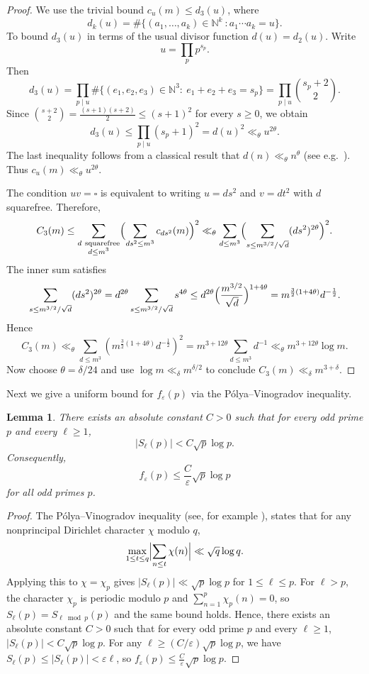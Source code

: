 \documentclass[11pt,letterpaper,reqno]{amsart}
\newtheorem{lemma}[theorem]{Lemma}
\theoremstyle{definition}
\numberwithin{equation}{section}
\newcommand{\eps}{\varepsilon}
\newcommand{\1}{\mathbf{1}}
\begin{document}
\begin{proof}

We use the trivial bound $c_u(m)\le d_3(u)$, where 
\[d_k(u)=\#\{(a_1,\dots,a_k)\in \mathbb{N}^k\ :a_1\dotsm a_k=u\}.\]
To bound $d_3(u)$ in terms of the usual divisor function $d(u)=d_2(u)$. Write
\[
u=\prod_{p}p^{s_p}.
\]
Then
\[
d_3(u)
=\prod_{p\mid u}\#\{(e_1,e_2,e_3)\in\mathbb{N}^3:\ e_1+e_2+e_3=s_p\}
=\prod_{p\mid u}\binom{s_p+2}{2}.
\]
Since $\binom{s+2}{2}=\frac{(s+1)(s+2)}{2}\le (s+1)^2$ for every $s\ge0$, we obtain
\[
d_3(u)\le \prod_{p\mid u}(s_p+1)^2=d(u)^2\ll_{\theta} u^{2\theta}.
\]
The last inequality follows from a classical result that $d(n)\ll_{\theta} n^{\theta}$ (see e.g.\ \cite[Theorem 315]{HW}). Thus $c_u(m)\ll_\theta u^{2\theta}$.

The condition $uv=\square$ is equivalent to writing $u=ds^2$ and $v=dt^2$ with $d$ squarefree.
Therefore,
\[
C_3(m)\le \sum_{\substack{d\ \mathrm{squarefree}\\ d\le m^3}}
\Bigl(\sum_{ds^2\le m^3} c_{ds^2}(m)\Bigr)^2
\ll_\theta \sum_{d\le m^3}\Bigl(\sum_{s\le m^{3/2}/\sqrt d} (ds^2)^{2\theta}\Bigr)^2.
\]
The inner sum satisfies
\[
\sum_{s\le m^{3/2}/\sqrt d} (ds^2)^{2\theta}
= d^{2\theta} \sum_{s\le m^{3/2}/\sqrt d} s^{4\theta}
\leq d^{2\theta}\Bigl(\frac{m^{3/2}}{\sqrt d}\Bigr)^{1+4\theta}
= m^{\frac32(1+4\theta)}d^{-\frac{1}{2}}.
\]
Hence
\[
C_3(m)\ll_\theta \sum_{d\le m^3}\left( m^{\frac32(1+4\theta)} d^{-\frac{1}{2}} \right)^2
= m^{3+12\theta}\sum_{d\le m^3} d^{-1}
\ll_\theta m^{3+12\theta}\log m.
\]
Now choose $\theta=\delta/24$ and use $\log m\ll_\delta m^{\delta/2}$ to conclude $C_3(m)\ll_\delta m^{3+\delta}$.
\end{proof}

Next we give a uniform bound for $f_\eps(p)$ via the P\'olya--Vinogradov inequality.

\begin{lemma}\label{lem:PV-cutoff}
There exists an absolute constant $C>0$ such that for every odd prime $p$ and every $\ell\ge 1$,
\[
|S_\ell(p)| < C\sqrt{p}\log p.
\]
Consequently,
\[
f_\eps(p)\le \frac{C}{\eps}\sqrt{p}\log p
\]
for all odd primes $p$.
\end{lemma}

\begin{proof}
The P\'olya--Vinogradov inequality (see, for example \cite[Theorem~9.18]{MV}), states that for any nonprincipal Dirichlet character $\chi$ modulo $q$,
\[
\max_{1\le t\le q}\Bigl|\sum_{n\le t}\chi(n)\Bigr|\ll \sqrt{q}\log q.
\]
Applying this to $\chi=\chi_p$ gives $|S_\ell(p)|\ll \sqrt{p}\log p$ for $1\le \ell\le p$.
For $\ell>p$, the character $\chi_p$ is periodic modulo $p$ and $\sum_{n=1}^{p}\chi_p(n)=0$, so
$S_\ell(p)=S_{\ell\bmod p}(p)$ and the same bound holds. Hence, there exists an absolute constant $C>0$ such that for every odd prime $p$ and every $\ell\ge 1$, $|S_\ell(p)|< C\sqrt{p}\log p$. For any $\ell \geq (C/\eps)\sqrt{p}\log p$, we have
$S_\ell(p)\le |S_\ell(p)|<\eps \ell$, so  $f_\eps(p)\le \frac{C}{\eps}\sqrt{p}\log p$.
\end{proof}
\end{document}
